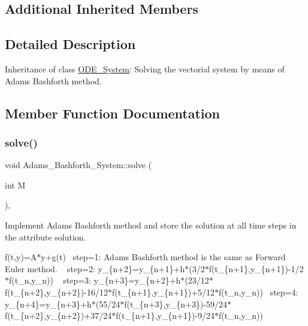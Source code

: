 \subsection*{Additional Inherited Members}


\subsection{Detailed Description}
Inheritance of class \mbox{\hyperlink{class_o_d_e___system}{O\+D\+E\+\_\+\+System}}\+: Solving the vectorial system by means of Adams Bashforth method. 

\subsection{Member Function Documentation}
\mbox{\label{class_adams___bashforth___system_acaf33d4f9f715a20a106f9029135cfe6}} 
\subsubsection{\texorpdfstring{solve()}{solve()}}
{\footnotesize\ttfamily void Adams\+\_\+\+Bashforth\+\_\+\+System\+::solve (\begin{DoxyParamCaption}\item[{int}]{M }\end{DoxyParamCaption})\hspace{0.3cm}{\ttfamily [override]}, {\ttfamily [virtual]}}



Implement Adams Bashforth method and store the solution at all time steps in the attribute solution. 

f(t,y)=A$\ast$y+g(t)~\newline
step=1\+: Adams Bashforth method is the same as Forward Euler method. ~\newline
step=2\+: y\+\_\+\{n+2\}=y\+\_\+\{n+1\}+h$\ast$(3/2$\ast$f(t\+\_\+\{n+1\},y\+\_\+\{n+1\})-\/1/2$\ast$f(t\+\_\+n,y\+\_\+n)) ~\newline
step=3\+: y\+\_\+\{n+3\}=y\+\_\+\{n+2\}+h$\ast$(23/12$\ast$f(t\+\_\+\{n+2\},y\+\_\+\{n+2\})-\/16/12$\ast$f(t\+\_\+\{n+1\},y\+\_\+\{n+1\})+5/12$\ast$f(t\+\_\+n,y\+\_\+n))~\newline
step=4\+: y\+\_\+\{n+4\}=y\+\_\+\{n+3\}+h$\ast$(55/24$\ast$f(t\+\_\+\{n+3\},y\+\_\+\{n+3\})-\/59/24$\ast$f(t\+\_\+\{n+2\},y\+\_\+\{n+2\})+37/24$\ast$f(t\+\_\+\{n+1\},y\+\_\+\{n+1\})-\/9/24$\ast$f(t\+\_\+n,y\+\_\+n)) ~\newline

